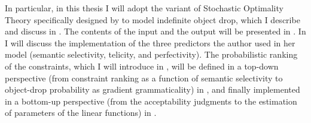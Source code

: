 In particular, in this thesis I will adopt the variant of Stochastic Optimality Theory specifically designed by \textcite{Medina2007} to model indefinite object drop, which I describe and discuss in . The contents of the input and the output will be presented in . In  I will discuss the implementation of the three predictors the author used in her model (semantic selectivity, telicity, and perfectivity). The probabilistic ranking of the constraints, which I will introduce in , will be defined in a top-down perspective (from constraint ranking as a function of semantic selectivity to object-drop probability as gradient grammaticality) in , and finally implemented in a bottom-up perspective (from the acceptability judgments to the estimation of parameters of the linear functions) in .


